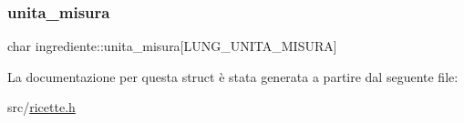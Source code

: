 \mbox{\label{structingrediente_ab434c5cb78713bf062a8729071d3bc0d}} 
\subsubsection{\texorpdfstring{unita\+\_\+misura}{unita\_misura}}
{\footnotesize\ttfamily char ingrediente\+::unita\+\_\+misura\mbox{[}L\+U\+N\+G\+\_\+\+U\+N\+I\+T\+A\+\_\+\+M\+I\+S\+U\+RA\mbox{]}}



La documentazione per questa struct è stata generata a partire dal seguente file\+:\begin{DoxyCompactItemize}
\item 
src/\hyperlink{ricette_8h}{ricette.\+h}\end{DoxyCompactItemize}
